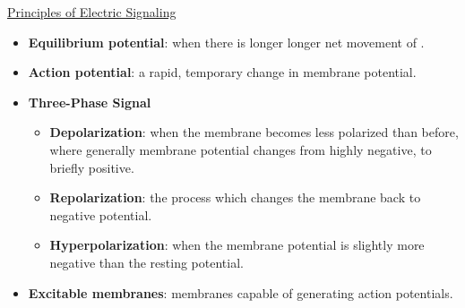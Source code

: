 \documentclass[12pt,letterpaper]{article}
\begin{document}
\begin{secbox}{\hyperlink{43}{Principles of Electric Signaling}}
{\begin{itemize}
        \item \textbf{Equilibrium potential}: when there is longer longer net movement of .
        \item \textbf{Action potential}: a rapid, temporary change in membrane potential. 
        \item \textbf{Three-Phase Signal}
            \begin{itemize}
                \item \textbf{Depolarization}: when the membrane becomes less polarized than before, where generally membrane potential changes from highly negative, to briefly positive.
                \item \textbf{Repolarization}: the process which changes the membrane back to negative potential.
                \item \textbf{Hyperpolarization}: when the membrane potential is slightly more negative than the resting potential.
            \end{itemize}
        \item \textbf{Excitable membranes}: membranes capable of generating action potentials. 
    \end{itemize}
}\end{secbox}
\end{document}
